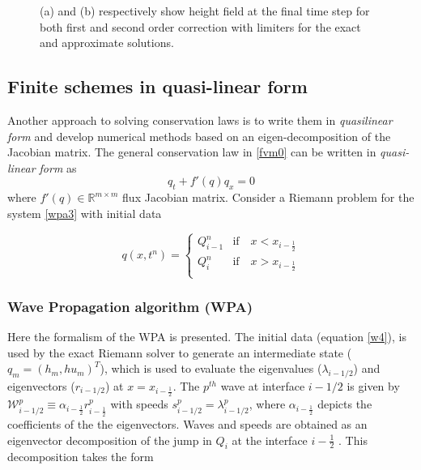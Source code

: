 \documentclass[10pt,a4paper]{article}
\begin{document}
\begin{figure}[H]
\begin{subfigure}[b]{0.5\textwidth}
			\caption{}
			\label{fig:exapp}
		\end{subfigure}
		\caption{(a) and (b) respectively show height field at the final time step for both first and second order correction with limiters for the exact and approximate solutions.}
	\end{figure}


	\subsection{Finite schemes in quasi-linear form}
	Another approach to solving conservation laws is to write  them in  {\em quasilinear form} and develop numerical methods based on an eigen-decomposition of the Jacobian matrix. The general conservation law in \eqref{fvm0} can be written in {\em quasi-linear form}
as
\begin{equation}
	q_{t} + f'(q)q_{x} = 0
	\label{wpa3}
\end{equation}
where  $f'(q) \in \mathbb{R}^{m\times m}$  flux Jacobian matrix.  Consider a Riemann problem for the system  \eqref{wpa3} with initial data 

\begin{equation}
	q(x,t^n)  = \begin{cases}
		Q_{i-1}^{n}  & \text{if} \quad  x < x_{i-\frac{1}{2}}\\
		Q_{i}^{n} & \text{if} \quad x > x_{i-\frac{1}{2}}\\
	\end{cases}    
	\label{w4}   
\end{equation}
\subsubsection{Wave Propagation algorithm (WPA)}
 Here the formalism of the WPA is presented.   The initial data (equation \eqref{w4}), is used by the exact Riemann solver to generate an intermediate state ($q_m = (h_m, hu_m)^T$), which is used to evaluate the eigenvalues ($\lambda_{i-1/2}$) and eigenvectors ($r_{i-1/2}$) at $x = x_{i-\frac{1}{2}}$. The $p^{th}$ wave at interface $i-1/2$ is given by $\mathcal W^p_{i-1/2} \equiv \alpha_{i-\frac{1}{2}} r^p_{i-\frac{1}{2}}$ with speeds $s^p_{i-1/2} = \lambda^p_{i-1/2}$, where $ \alpha_{i-\frac{1}{2}}$ depicts the coefficients of the the eigenvectors.  Waves and speeds are obtained as an eigenvector decomposition of the jump in $Q_i$ at the interface $i-\frac{1}{2}$ \cite{leveque2002finite,toro2001shock}.  This decomposition takes the form
\end{document}
